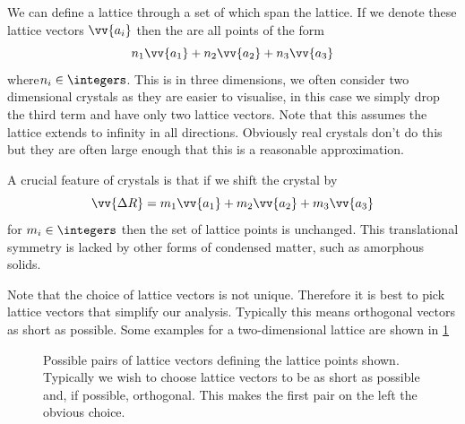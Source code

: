 \documentclass[fleqn]{NotesClass}
\begin{document}
    We can define a lattice through a set of  which span the lattice.
    If we denote these lattice vectors \(\vv{a_i}\) then the  are all points of the form
    \begin{equation}
        n_1\vv{a_1} + n_2\vv{a_2} + n_3\vv{a_3}
    \end{equation}
    where\(n_i\in\integers\).
    This is in three dimensions, we often consider two dimensional crystals as they are easier to visualise, in this case we simply drop the third term and have only two lattice vectors.
    Note that this assumes the lattice extends to infinity in all directions.
    Obviously real crystals don't do this but they are often large enough that this is a reasonable approximation.
    
    A crucial feature of crystals is that if we shift the crystal by
    \begin{equation}
        \vv{\Delta R} = m_1\vv{a_1} + m_2\vv{a_2} + m_3\vv{a_3}
    \end{equation}
    for \(m_i\in\integers\) then the set of lattice points is unchanged.
    This translational symmetry is lacked by other forms of condensed matter, such as amorphous solids.
    
    Note that the choice of lattice vectors is not unique.
    Therefore it is best to pick lattice vectors that simplify our analysis.
    Typically this means orthogonal vectors as short as possible.
    Some examples for a two-dimensional lattice are shown in \cref{fig:possible lattice vectors}
    \begin{figure}
        \caption[Possible square lattice vectors in 2D.]{Possible pairs of lattice vectors defining the lattice points shown. Typically we wish to choose lattice vectors to be as short as possible and, if possible, orthogonal. This makes the first pair on the left the obvious choice.}
        \label{fig:possible lattice vectors}
    \end{figure}
    
\end{document}

